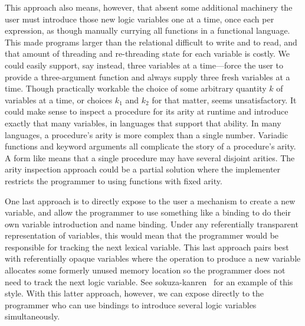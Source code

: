 \documentclass[sigplan,balance=true,pbalance=true,natbib=false]{acmart}
\begin{document}
This approach also means, however, that absent some additional
machinery the user must introduce those new logic variables one at a
time, once each per  expression, as though
manually currying all functions in a functional language. This made
programs larger than the relational  difficult to
write and to read, and that amount of threading and re-threading state
for each variable is costly. We could easily support, say instead,
three variables at a time---force the user to provide a three-argument
function and always supply three fresh variables at a time. Though
practically workable the choice of some arbitrary quantity $k$ of
variables at a time, or choices $k_{1}$ and $k_{2}$ for that matter,
seems unsatisfactory. It could make sense to inspect a procedure for
its arity at runtime and introduce exactly that many variables, in
languages that support that ability. In many languages, a procedure's
arity is more complex than a single number. Variadic functions and
keyword arguments all complicate the story of a procedure's arity. A
form like  means that a single procedure may
have several disjoint arities. The arity inspection approach could be
a partial solution where the implementer restricts the programmer to
using functions with fixed arity.

One last approach is to directly expose to the user a mechanism to
create a new variable, and allow the programmer to use something like
a  binding to do their own variable introduction and
name binding. Under any referentially transparent representation of
variables, this would mean that the programmer would be responsible
for tracking the next lexical variable. This last approach pairs best
with referentially opaque variables where the operation to produce a
new variable allocates some formerly unused memory location so the
programmer does not need to track the next logic variable. See
sokuza-kanren~\cite{kiselyov2006taste} for an example of this style.
With this latter approach, however, we can expose 
directly to the programmer who can use  bindings to
introduce several logic variables simultaneously.

\subsection{}
\end{document}
